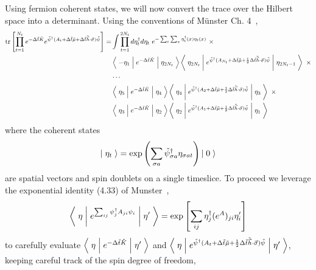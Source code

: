 Using fermion coherent states, we will now convert the trace over the Hilbert space into a determinant.
Using the conventions of M\"{u}nster Ch. 4~\cite{munster},
\begin{align}
	\text{tr}\left[\prod_{t=1}^{N_t} e^{-\Delta \tilde{t}\tilde{K}}  e^{ \tilde{\psi}{}^{\dagger} (A_t + \Delta\tilde{t} \tilde{\mu} + \Delta\tilde{t}\tilde{\vec{h}}\cdot\vec{\sigma}) \tilde{\psi} }\right]
	=& \int \prod_{t=1}^{2N_t} d \eta^{\dagger}_t d\eta_t ~ e^{- \sum_{t}\sum_x \eta^{\dagger}_t(x) \eta_t(x)}~ \times
	\nonumber\\
	&
		\left\langle\; -\eta_1 \;\middle|\; e^{-\Delta \tilde{t}\tilde{K} }\;\middle|\;\eta_{2 N_t}\;\right\rangle
		\left\langle\; \eta_{2 N_t} \;\middle|\; e^{ \tilde{\psi}{}^{\dagger} (A_{N_t} + \Delta\tilde{t}\tilde{\mu} + \frac{1}{2} \Delta\tilde{t}\tilde{\vec{h}}\cdot\vec{\sigma})\tilde{\psi} } \;\middle|\;\eta_{2 N_t-1}\;\right\rangle ~ \times
	\nonumber\\
	&
		\cdots
	\nonumber\\
	&
		\left\langle\; \eta_5 \;\middle|\; e^{-\Delta \tilde{t}\tilde{K} }\;\middle|\;\eta_{4}\;\right\rangle
		\left\langle\; \eta_4 \;\middle|\; e^{ \tilde{\psi}{}^{\dagger} (A_{2} + \Delta\tilde{t}\tilde{\mu} + \frac{1}{2} \Delta\tilde{t}\tilde{\vec{h}}\cdot\vec{\sigma}) \tilde{\psi}} \;\middle|\;\eta_3\;\right\rangle ~ \times
	\nonumber\\
	&
		\left\langle\; \eta_3 \;\middle|\; e^{-\Delta \tilde{t}\tilde{K} }\;\middle|\;\eta_{2}\;\right\rangle
		\left\langle\; \eta_2 \;\middle|\; e^{ \tilde{\psi}{}^{\dagger} (A_{1} + \Delta\tilde{t}\tilde{\mu} + \frac{1}{2} \Delta\tilde{t}\tilde{\vec{h}}\cdot\vec{\sigma}) \tilde{\psi}} \;\middle|\;\eta_1\;\right\rangle
	\label{eq:coherent state trace}
\end{align}
where the coherent states
\begin{equation}
	\left|\;\eta_t\;\right\rangle = \exp\left( \sum_{\sigma a} \tilde{\psi}^{\dagger}_{\sigma a} \eta_{\sigma a t} \right) \left|\;0\;\right\rangle
	\label{eq:coherent state}
\end{equation}
are spatial vectors and spin doublets on a single timeslice.
To proceed we leverage the exponential identity (4.33) of Munster~\cite{munster},
\begin{equation}
	\left\langle\; \eta \;\middle|\; e^{\sum_{ij} \psi^{\dagger}_j A_{ji} \psi_i} \;\middle|\; \eta' \;\right\rangle
	=
	\exp\left[ \sum_{i j} \eta^{\dagger}_j (e^A)_{ji} \eta'_i \right]
\end{equation}
to carefully evaluate $\left\langle\;\eta\;\middle|\; e^{-\Delta \tilde{t}\tilde{K}} \;\middle|\;\eta'\;\right\rangle$ and $\left\langle\;\eta\;\middle|\; e^{\tilde{\psi}{}^{\dagger}(A_t + \Delta \tilde{t} \tilde{\mu} + \frac{1}{2} \Delta\tilde{t}\tilde{\vec{h}}\cdot\vec{\sigma})\tilde{\psi}} \;\middle|\;\eta'\;\right\rangle$, keeping careful track of the spin degree of freedom,
